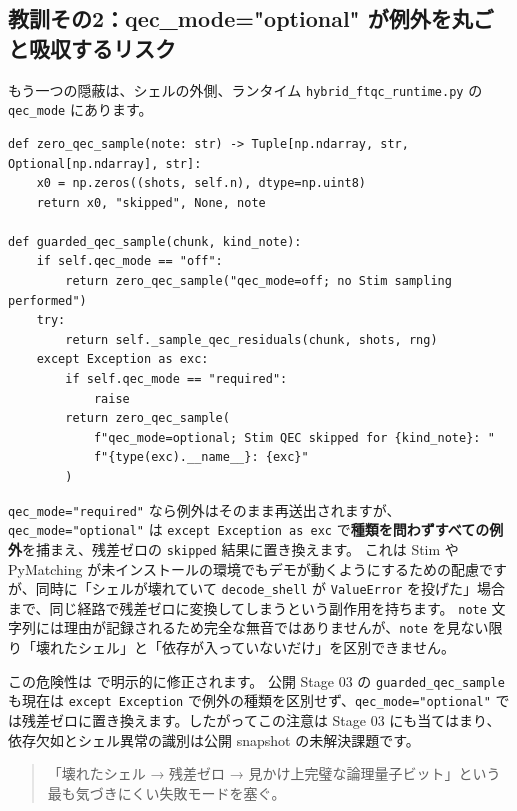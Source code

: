 \subsection{教訓その2：qec\_mode="optional" が例外を丸ごと吸収するリスク}

もう一つの隠蔽は、シェルの外側、ランタイム \texttt{hybrid\_ftqc\_runtime.py} の \texttt{qec\_mode} にあります。

\begin{lstlisting}[caption={qec\_mode によるガード（src/stages/02\_circuit\_level/src/ftqc/hybrid\_ftqc\_runtime.py）}]
def zero_qec_sample(note: str) -> Tuple[np.ndarray, str, Optional[np.ndarray], str]:
    x0 = np.zeros((shots, self.n), dtype=np.uint8)
    return x0, "skipped", None, note

def guarded_qec_sample(chunk, kind_note):
    if self.qec_mode == "off":
        return zero_qec_sample("qec_mode=off; no Stim sampling performed")
    try:
        return self._sample_qec_residuals(chunk, shots, rng)
    except Exception as exc:
        if self.qec_mode == "required":
            raise
        return zero_qec_sample(
            f"qec_mode=optional; Stim QEC skipped for {kind_note}: "
            f"{type(exc).__name__}: {exc}"
        )
\end{lstlisting}

\texttt{qec\_mode="required"} なら例外はそのまま再送出されますが、\texttt{qec\_mode="optional"} は \texttt{except Exception as exc} で\textbf{種類を問わずすべての例外}を捕まえ、残差ゼロの \texttt{skipped} 結果に置き換えます。
これは Stim や PyMatching が未インストールの環境でもデモが動くようにするための配慮ですが、同時に「シェルが壊れていて \texttt{decode\_shell} が \texttt{ValueError} を投げた」場合まで、同じ経路で残差ゼロに変換してしまうという副作用を持ちます。
\texttt{note} 文字列には理由が記録されるため完全な無音ではありませんが、\texttt{note} を見ない限り「壊れたシェル」と「依存が入っていないだけ」を区別できません。

この危険性は  で明示的に修正されます。
公開 Stage 03 の \texttt{guarded\_qec\_sample} も現在は \texttt{except Exception} で例外の種類を区別せず、\texttt{qec\_mode="optional"} では残差ゼロに置き換えます。したがってこの注意は Stage 03 にも当てはまり、依存欠如とシェル異常の識別は公開 snapshot の未解決課題です。

\begin{quote}
「壊れたシェル → 残差ゼロ → 見かけ上完璧な論理量子ビット」という最も気づきにくい失敗モードを塞ぐ。
\end{quote}

